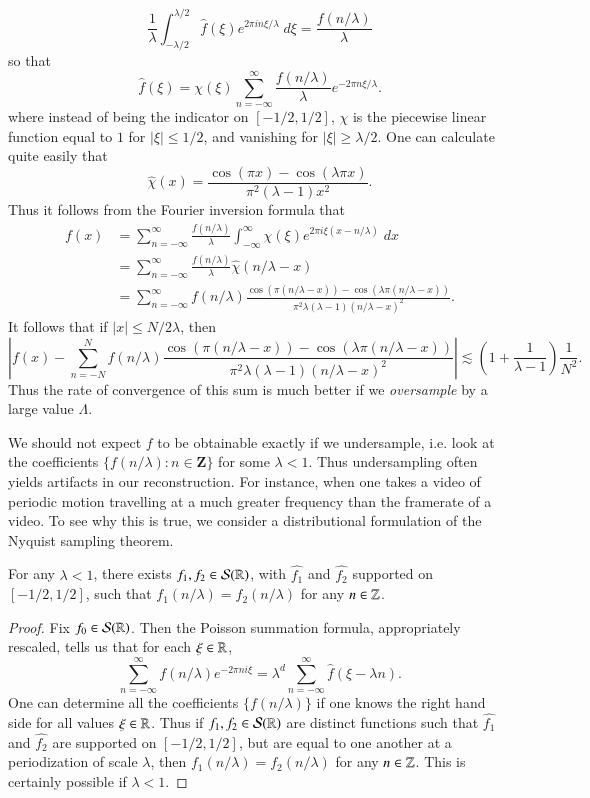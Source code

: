 %
\[ \frac{1}{\lambda} \int_{-\lambda/2}^{\lambda/2} \widehat{f}(\xi) e^{2 \pi i n \xi / \lambda}\; d\xi = \frac{f(n/\lambda)}{\lambda} \]
%
so that
%
\[ \widehat{f}(\xi) = \chi(\xi) \sum_{n = -\infty}^\infty \frac{f(n/\lambda)}{\lambda} e^{-2 \pi n \xi / \lambda}. \]
%
where instead of being the indicator on $[-1/2,1/2]$, $\chi$ is the piecewise linear function equal to $1$ for $|\xi| \leq 1/2$, and vanishing for $|\xi| \geq \lambda/2$. One can calculate quite easily that
%
\[ \widehat{\chi}(x) = \frac{\cos(\pi x) - \cos(\lambda \pi x)}{\pi^2 (\lambda - 1) x^2}. \]
%
Thus it follows from the Fourier inversion formula that
%
\begin{align*}
    f(x) &= \sum_{n = -\infty}^\infty \frac{f(n/\lambda)}{\lambda} \int_{-\infty}^\infty \chi(\xi) e^{2 \pi i \xi (x-n/\lambda)}\; dx\\
    &= \sum_{n = -\infty}^\infty \frac{f(n/\lambda)}{\lambda} \widehat{\chi}(n/\lambda - x)\\
    &= \sum_{n = -\infty}^\infty f(n/\lambda) \frac{\cos(\pi (n / \lambda - x)) - \cos(\lambda \pi (n / \lambda - x))}{\pi^2 \lambda (\lambda - 1)(n/\lambda - x)^2}.
\end{align*}
%
It follows that if $|x| \leq N/2\lambda$, then
%
\[ \left| f(x) - \sum_{n = -N}^N f(n/\lambda) \frac{\cos(\pi (n / \lambda - x)) - \cos(\lambda \pi (n / \lambda - x))}{\pi^2 \lambda (\lambda - 1)(n/\lambda - x)^2} \right| \lesssim \left( 1 + \frac{1}{\lambda - 1} \right) \frac{1}{N^2}. \]
%
Thus the rate of convergence of this sum is much better if we \emph{oversample} by a large value $\Lambda$.

We should not expect $f$ to be obtainable exactly if we undersample, i.e. look at the coefficients $\{ f(n/\lambda) : n \in \mathbf{Z} \}$ for some $\lambda < 1$. Thus undersampling often yields artifacts in our reconstruction. For instance, when one takes a video of periodic motion travelling at a much greater frequency than the framerate of a video. To see why this is true, we consider a distributional formulation of the Nyquist sampling theorem.

\begin{theorem}
    For any $\lambda < 1$, there exists $f_1,f_2 \in \mathcal{S}(\operatorname{\mathbb{R}})$, with $\widehat{f_1}$ and $\widehat{f_2}$ supported on $[-1/2,1/2]$, such that $f_1(n/\lambda) = f_2(n/\lambda)$ for any $n \in \operatorname{\mathbb{Z}}$.
\end{theorem}
\begin{proof}
    Fix $f_0 \in \mathcal{S}(\operatorname{\mathbb{R}})$. Then the Poisson summation formula, appropriately rescaled, tells us that for each $\xi \in \operatorname{\mathbb{R}}$,
    \[ \sum_{n = -\infty}^\infty f(n/\lambda) e^{-2 \pi n i \xi} = \lambda^d \sum_{n = -\infty}^\infty \widehat{f}(\xi - \lambda n). \]
    One can determine all the coefficients $\{ f(n/\lambda) \}$ if one knows the right hand side for all values $\xi \in \operatorname{\mathbb{R}}$. Thus if $f_1,f_2 \in \mathcal{S}(\operatorname{\mathbb{R}})$ are distinct functions such that $\widehat{f_1}$ and $\widehat{f_2}$ are supported on $[-1/2,1/2]$, but are equal to one another at a periodization of scale $\lambda$, then $f_1(n/\lambda) = f_2(n/\lambda)$ for any $n \in \operatorname{\mathbb{Z}}$. This is certainly possible if $\lambda < 1$.
\end{proof}

